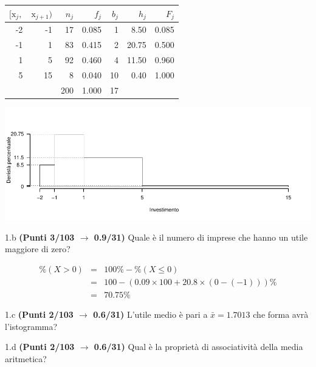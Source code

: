 \documentclass[
  11pt,
]{book}
\theoremstyle{mytheoremstyle}
\theoremstyle{mydefstyle}
\newenvironment{sol}
  {
  \begin{tcolorbox}[enhanced,breakable,arc=0.1mm,boxrule=1pt,colback=white,colframe=iblue,
  title=\bf \fontfamily{lmss}\selectfont \hspace{.5 cm} Soluzione,drop fuzzy shadow]

}{
\end{tcolorbox}
  }
\begin{document}
\begin{sol}

\begin{table}[H]
\centering
\begin{tabular}{rrrrrrr}
\toprule
$[\text{x}_j,$ & $\text{x}_{j+1})$ & $n_j$ & $f_j$ & $b_j$ & $h_j$ & $F_j$\\
\midrule
-2 & -1 & 17 & 0.085 & 1 & 8.50 & 0.085\\
-1 & 1 & 83 & 0.415 & 2 & 20.75 & 0.500\\
1 & 5 & 92 & 0.460 & 4 & 11.50 & 0.960\\
5 & 15 & 8 & 0.040 & 10 & 0.40 & 1.000\\
 &  & 200 & 1.000 & 17 &  & \\
\bottomrule
\end{tabular}
\end{table}

\begin{center}\includegraphics{Esami_passati_con_soluzioni_files/figure-latex/2023-137-1} \end{center}

\end{sol}

1.b \textbf{(Punti 3/103 \(\rightarrow\) 0.9/31)} Quale è il numero di imprese che hanno un utile maggiore di zero?

\begin{sol}
\begin{eqnarray*}
  \%(X>0) &=&  100\%-\%(X\le 0)\\
  &=& 100 - (0.09\times 100 + 20.8\times(0-(-1)))\%\\
  &=& 70.75\%
\end{eqnarray*}

\end{sol}

1.c \textbf{(Punti 2/103 \(\rightarrow\) 0.6/31)} L'utile medio è pari a \(\bar x=1.7013\) che forma avrà l'istogramma?

1.d \textbf{(Punti 2/103 \(\rightarrow\) 0.6/31)} Qual è la proprietà di associatività della media aritmetica?
\end{document}
